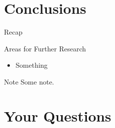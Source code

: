 \documentclass[
  size=10pt,
  style=klope,
  paper=screen,
  pauseslide,
  nopagebreaks,
  hlsections,
  fleqn
]{powerdot}
\begin{document}
\section[template=wideslide]{Conclusions}

\begin{slide}[toc=Recap]{Recap}
\tableofcontents[content=all,type=0]
\end{slide}

\begin{slide}{Areas for Further Research}
  \begin{itemize}
  \item
  Something
  \end{itemize}
\end{slide}

\begin{note}{Note}
  Some note.
\end{note}

\section[template=wideslide]{Your Questions}
\end{document}
